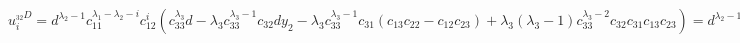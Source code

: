 %
%
$ u_i^{_{32}D} = d^{\lambda_2 - 1} c_{11}^{\lambda_1 - \lambda_2 - i} c_{12}^i (c_{33}^{\lambda_3} d - \lambda_3 c_{33}^{\lambda_3 - 1} c_{32} d y_2 - \lambda_3 c_{33}^{\lambda_3 - 1} c_{31}(c_{13}c_{22} - c_{12}c_{23}) + \lambda_3 (\lambda_3 - 1) c_{33}^{\lambda_3 - 2} c_{32}c_{31}c_{13}c_{23}) = d^{\lambda_2 - 1} c_{11}^{\lambda_1 - \lambda_2 - i} c_{12}^i (c_{33}^{\lambda_3} d - \lambda_3 c_{33}^{\lambda_3 - 1} (c_{31} d y_1 + c_{32} d y_2) + \lambda_3 (\lambda_3 - 1) c_{33}^{\lambda_3 - 2} c_{31}c_{13}c_{32}c_{23}) = v_i $